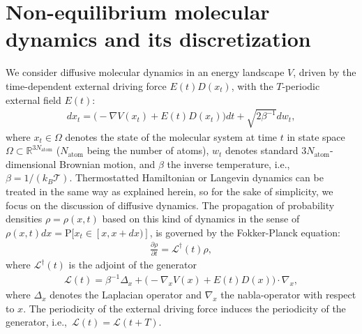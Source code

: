 \documentclass[journal=jctcce,manuscript=article]{achemso}
\newcommand{\vect}[1]{#1}
\newcommand{\ml}[0]{\mathcal {L}}
\newcommand{\prob}{\textrm{P}}
\begin{document}
\section{Non-equilibrium molecular dynamics and its discretization}
\label{sec:disc}
We consider diffusive molecular dynamics in an energy landscape $V$, driven by the time-dependent external driving force $E(t)D(x_t)$, with the
$T$-periodic external field $E(t)$:
\begin{align}
  \label{eq:disc-1}
  d\vect x_t = \Big(-\nabla V(\vect x_t) + E(t) D(\vect x_t)\Big)dt + \sqrt{2\beta^{-1}} d\vect w_t, 
\end{align}
where $x_t\in\Omega$ denotes the state of the molecular system at time $t$ in state space $\Omega \subset \mathbb R^{3N_{\textrm{atom}}}$ ($N_{\textrm{atom}}$ being the number of atoms), $\vect w_t$ denotes standard $3N_{\textrm{atom}}$-dimensional Brownian motion, and $\beta$ the inverse temperature,
i.e.,~$\beta = 1/(k_B\mathcal T)$.
Thermostatted Hamiltonian or Langevin dynamics can be treated in the same way as explained herein, so for the sake of simplicity, we focus on the discussion of diffusive dynamics.
The propagation of probability
densities $\rho=\rho(\vect x,t)$ based on this kind of dynamics in the sense
of $\rho(\vect x,t)dx=\prob[\vect x_t\in [\vect x,\vect x+d\vect x)]$, is governed by
the Fokker-Planck equation:
\begin{align}
  \label{eq:disc-fp}
  \frac{\partial \rho}{\partial t} = \ml^\dagger(t) \rho,
\end{align}
where $\ml^\dagger(t)$ is the adjoint of the generator
\begin{align}
  \label{eq:disc-3}
  \ml(t)=\beta^{-1}\Delta_{\vect x}+\Big(-\nabla_x V(\vect x) + E(t)D(\vect x)\Big)\cdot\nabla_{\vect x},
\end{align}
where $\Delta_{\vect x}$ denotes the Laplacian operator and $\nabla_{\vect x}$
the nabla-operator with respect to $\vect x$. 
The periodicity of the external driving force induces the periodicity of the generator,
i.e.,~$\ml(t) = \ml(t+T)$.  

\end{document}
